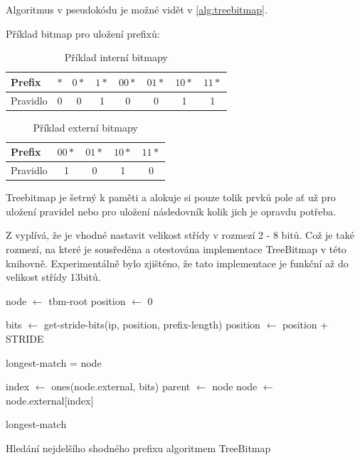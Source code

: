 Algoritmus v pseudokódu je možné vidět v \ref{alg:treebitmap}.

Příklad bitmap pro uložení prefixů:

\begin{table}
	\center
	\label{tab:tbm-internal}
    \begin{tabular}{|l||c|c|c|c|c|c|c|}
    \hline
    Prefix & $*$ & $0*$ & $1*$ & $00*$ & $01*$ & $10*$ & $11*$ \\ \hline
    Pravidlo & 0 & 0  & 1  & 0   & 0   & 1   & 1   \\ \hline
    \end{tabular}
    \caption{Příklad interní bitmapy}
\end{table}

\begin{table}
	\center
	\label{tab:tbm-external}
    \begin{tabular}{|l||c|c|c|c|}
    \hline
    Prefix & $00*$ & $01*$ & $10*$ & $11*$ \\ \hline
    Pravidlo & 1 & 0 & 1 & 0 \\ \hline
    \end{tabular}
    \caption{Příklad externí bitmapy}
\end{table}

Treebitmap je šetrný k paměti a alokuje si pouze tolik prvků pole ať už pro uložení pravidel
nebo pro uložení následovník kolik jich je opravdu potřeba.

Z \cite{tbm} vyplívá, že je vhodné nastavit velikost střídy v rozmezí 2 - 8 bitů. Což je také rozmezí,
na které je sousředěna a otestována implementace TreeBitmap v této knihovně. Experimentálně bylo zjišténo,
že tato implementace je funkční až do velikost střídy 13bitů.

\begin{algorithm}[H]
	\label{alg:treebitmap}
	node $\leftarrow$ tbm-root\;
	position $\leftarrow$ 0\;
	{
		bits $\leftarrow$ get-stride-bits(ip, position, prefix-length)\;
		position $\leftarrow$ position + STRIDE\;

		{
			longest-match = node\;
		}

		index $\leftarrow$ ones(node.external, bits)\;
		parent $\leftarrow$ node\;
		node $\leftarrow$ node.external[index]\;
	}
	\Return longest-match\;
	\caption{Hledání nejdelšího shodného prefixu algoritmem TreeBitmap}
\end{algorithm}

